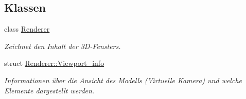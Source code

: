 \subsection*{Klassen}
\begin{DoxyCompactItemize}
\item 
class \hyperlink{classRenderer}{Renderer}
\begin{DoxyCompactList}\small\item\em Zeichnet den Inhalt der 3\-D-\/\-Fensters. \end{DoxyCompactList}\item 
struct \hyperlink{structRenderer_1_1Viewport__info}{Renderer\-::\-Viewport\-\_\-info}
\begin{DoxyCompactList}\small\item\em Informationen über die Ansicht des Modells (Virtuelle Kamera) und welche Elemente dargestellt werden. \end{DoxyCompactList}\end{DoxyCompactItemize}
